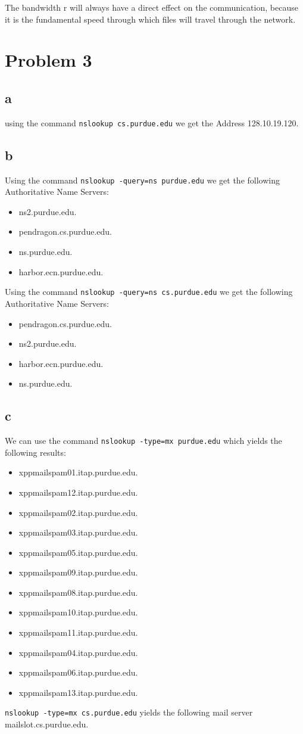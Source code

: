 \documentclass[paper=a4, fontsize=11pt]{scrartcl}
\numberwithin{equation}{section}		%
\numberwithin{figure}{section}			%
\numberwithin{table}{section}				%
\begin{document}
The bandwidth r will always have a direct effect on the communication, because it is the fundamental speed through which files will travel through the network.

\section*{Problem 3}
\subsection*{a}
using the command \verb|nslookup cs.purdue.edu| we get the Address 128.10.19.120.

\subsection*{b}
Using the command \verb|nslookup -query=ns purdue.edu| we get the following Authoritative Name Servers:

\begin{itemize}
\item ns2.purdue.edu.
\item pendragon.cs.purdue.edu.
\item ns.purdue.edu.
\item harbor.ecn.purdue.edu.
\end{itemize}

Using the command \verb|nslookup -query=ns cs.purdue.edu| we get the following Authoritative Name Servers:

\begin{itemize}
\item pendragon.cs.purdue.edu.
\item ns2.purdue.edu.
\item harbor.ecn.purdue.edu.
\item ns.purdue.edu.
\end{itemize}

\subsection*{c}
We can use the command \verb|nslookup -type=mx purdue.edu|
which yields the following results:

\begin{itemize}
\item xppmailspam01.itap.purdue.edu.
\item xppmailspam12.itap.purdue.edu.
\item xppmailspam02.itap.purdue.edu.
\item xppmailspam03.itap.purdue.edu.
\item xppmailspam05.itap.purdue.edu.
\item xppmailspam09.itap.purdue.edu.
\item xppmailspam08.itap.purdue.edu.
\item xppmailspam10.itap.purdue.edu.
\item xppmailspam11.itap.purdue.edu.
\item xppmailspam04.itap.purdue.edu.
\item xppmailspam06.itap.purdue.edu.
\item xppmailspam13.itap.purdue.edu.
\end{itemize}

\verb|nslookup -type=mx cs.purdue.edu| yields the following mail server mailslot.cs.purdue.edu.

\end{document}
